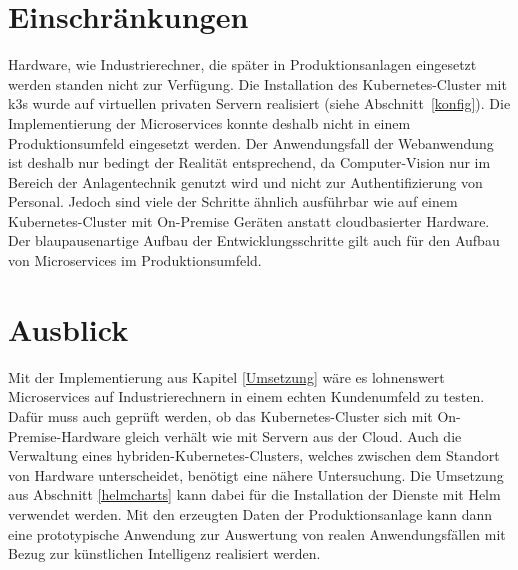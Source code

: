 \section{Einschränkungen}\label{Einschraenkungen}
Hardware, wie Industrierechner, die später in Produktionsanlagen eingesetzt werden standen nicht zur Verfügung.
Die Installation des Kubernetes-Cluster mit k3s wurde auf virtuellen privaten Servern realisiert (siehe Abschnitt~\ref{konfig}).
Die Implementierung der Microservices konnte deshalb nicht in einem Produktionsumfeld eingesetzt werden.
Der Anwendungsfall der Webanwendung ist deshalb nur bedingt der Realität entsprechend, da Computer-Vision nur im Bereich der Anlagentechnik genutzt wird und nicht zur Authentifizierung von Personal.
Jedoch sind viele der Schritte ähnlich ausführbar wie auf einem Kubernetes-Cluster mit On-Premise Geräten anstatt cloudbasierter Hardware.
Der blaupausenartige Aufbau der Entwicklungsschritte gilt auch für den Aufbau von Microservices im Produktionsumfeld.

\section{Ausblick}
Mit der Implementierung aus Kapitel \ref{Umsetzung} wäre es lohnenswert Microservices auf Industrierechnern in einem echten Kundenumfeld zu testen.
Dafür muss auch geprüft werden, ob das Kubernetes-Cluster sich mit On-Premise-Hardware gleich verhält wie mit Servern aus der Cloud.
Auch die Verwaltung eines hybriden-Kubernetes-Clusters, welches zwischen dem Standort von Hardware unterscheidet, benötigt eine nähere Untersuchung.
Die Umsetzung aus Abschnitt \ref{helmcharts} kann dabei für die Installation der Dienste mit Helm verwendet werden.
Mit den erzeugten Daten der Produktionsanlage kann dann eine prototypische Anwendung zur Auswertung von realen Anwendungsfällen mit Bezug zur künstlichen Intelligenz realisiert werden.
